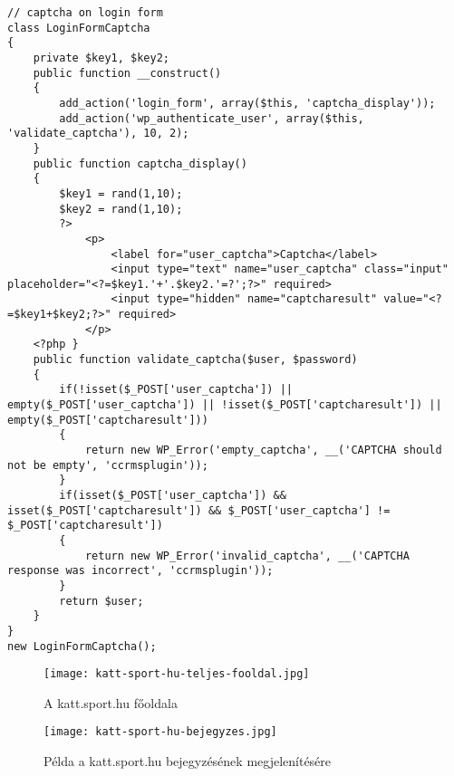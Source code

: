 \begin{lstlisting}
// captcha on login form
class LoginFormCaptcha
{
	private $key1, $key2;
	public function __construct()
	{
		add_action('login_form', array($this, 'captcha_display'));
		add_action('wp_authenticate_user', array($this, 'validate_captcha'), 10, 2);
	}
	public function captcha_display()
	{
		$key1 = rand(1,10);
		$key2 = rand(1,10);
		?>
			<p>
				<label for="user_captcha">Captcha</label>
				<input type="text" name="user_captcha" class="input" placeholder="<?=$key1.'+'.$key2.'=?';?>" required>
				<input type="hidden" name="captcharesult" value="<?=$key1+$key2;?>" required>
			</p>
	<?php }
	public function validate_captcha($user, $password)
	{
		if(!isset($_POST['user_captcha']) || empty($_POST['user_captcha']) || !isset($_POST['captcharesult']) || empty($_POST['captcharesult']))
		{
			return new WP_Error('empty_captcha', __('CAPTCHA should not be empty', 'ccrmsplugin'));
		}
		if(isset($_POST['user_captcha']) && isset($_POST['captcharesult']) && $_POST['user_captcha'] != $_POST['captcharesult'])
		{
			return new WP_Error('invalid_captcha', __('CAPTCHA response was incorrect', 'ccrmsplugin'));
		}
		return $user;
	}
}
new LoginFormCaptcha();
\end{lstlisting}

\newpage


\begin{figure}[H]
	\centering
		\texttt{[image: katt-sport-hu-teljes-fooldal.jpg]}
		\caption{A katt.sport.hu főoldala}
\end{figure}

\begin{figure}[H]
	\centering
		\texttt{[image: katt-sport-hu-bejegyzes.jpg]}
		\caption{Példa a katt.sport.hu bejegyzésének megjelenítésére}
\end{figure}

\newpage